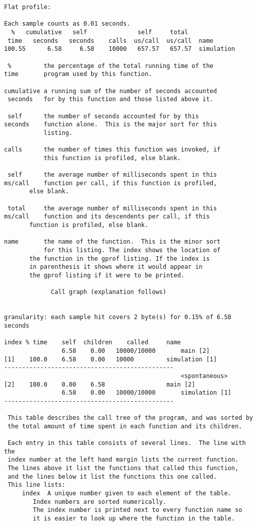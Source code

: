 \begin{lstlisting}[breaklines=true]
Flat profile:

Each sample counts as 0.01 seconds.
  %   cumulative   self              self     total           
 time   seconds   seconds    calls  us/call  us/call  name    
100.55      6.58     6.58    10000   657.57   657.57  simulation

 %         the percentage of the total running time of the
time       program used by this function.

cumulative a running sum of the number of seconds accounted
 seconds   for by this function and those listed above it.

 self      the number of seconds accounted for by this
seconds    function alone.  This is the major sort for this
           listing.

calls      the number of times this function was invoked, if
           this function is profiled, else blank.
 
 self      the average number of milliseconds spent in this
ms/call    function per call, if this function is profiled,
	   else blank.

 total     the average number of milliseconds spent in this
ms/call    function and its descendents per call, if this 
	   function is profiled, else blank.

name       the name of the function.  This is the minor sort
           for this listing. The index shows the location of
	   the function in the gprof listing. If the index is
	   in parenthesis it shows where it would appear in
	   the gprof listing if it were to be printed.

		     Call graph (explanation follows)


granularity: each sample hit covers 2 byte(s) for 0.15% of 6.58 seconds

index % time    self  children    called     name
                6.58    0.00   10000/10000       main [2]
[1]    100.0    6.58    0.00   10000         simulation [1]
-----------------------------------------------
                                                 <spontaneous>
[2]    100.0    0.00    6.58                 main [2]
                6.58    0.00   10000/10000       simulation [1]
-----------------------------------------------

 This table describes the call tree of the program, and was sorted by
 the total amount of time spent in each function and its children.

 Each entry in this table consists of several lines.  The line with the
 index number at the left hand margin lists the current function.
 The lines above it list the functions that called this function,
 and the lines below it list the functions this one called.
 This line lists:
     index	A unique number given to each element of the table.
		Index numbers are sorted numerically.
		The index number is printed next to every function name so
		it is easier to look up where the function in the table.


\end{lstlisting}
